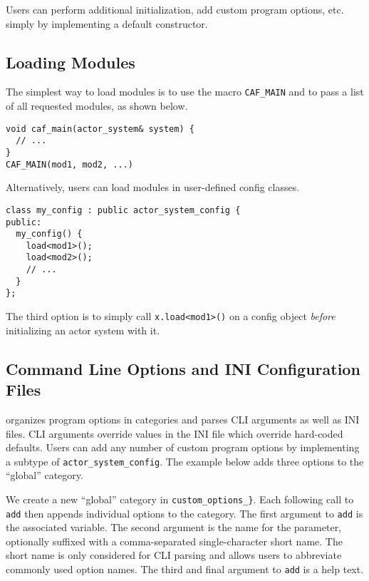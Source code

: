 Users can perform additional initialization, add custom program options, etc.
simply by implementing a default constructor.

\subsection{Loading Modules}
\label{system-config-module}

The simplest way to load modules is to use the macro \lstinline^CAF_MAIN^ and
to pass a list of all requested modules, as shown below.

\begin{lstlisting}
void caf_main(actor_system& system) {
  // ...
}
CAF_MAIN(mod1, mod2, ...)
\end{lstlisting}

Alternatively, users can load modules in user-defined config classes.

\begin{lstlisting}
class my_config : public actor_system_config {
public:
  my_config() {
    load<mod1>();
    load<mod2>();
    // ...
  }
};
\end{lstlisting}

The third option is to simply call \lstinline^x.load<mod1>()^ on a config
object \emph{before} initializing an actor system with it.

\subsection{Command Line Options and INI Configuration Files}
\label{system-config-options}

\lib organizes program options in categories and parses CLI arguments as well
as INI files. CLI arguments override values in the INI file which override
hard-coded defaults. Users can add any number of custom program options by
implementing a subtype of \lstinline^actor_system_config^. The example below
adds three options to the ``global'' category.


We create a new ``global'' category in  \lstinline^custom_options_}^. Each
following call to \lstinline^add^ then appends individual options to the
category. The first argument to \lstinline^add^ is the associated variable. The
second argument is the name for the parameter, optionally suffixed with a
comma-separated single-character short name. The short name is only considered
for CLI parsing and allows users to abbreviate commonly used option names. The
third and final argument to \lstinline^add^ is a help text.

